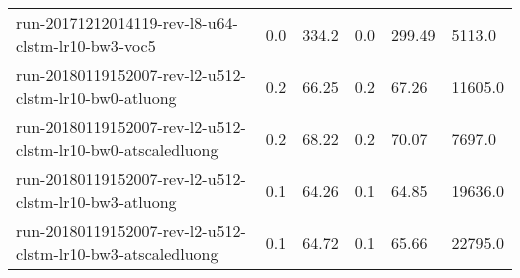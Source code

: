 \begin{landscape}
\begin{longtable}{p{.47\textheight} p{.08\textheight} p{.08\textheight} p{.08\textheight} p{.08\textheight} p{.08\textheight}}
    run-20171212014119-rev-l8-u64-clstm-lr10-bw3-voc5 & \num{0.0} & \num{334.2} & \num{0.0} & \num{299.49} & \num{5113.0}\\
    run-20180119152007-rev-l2-u512-clstm-lr10-bw0-atluong & \num{0.2} & \num{66.25} & \num{0.2} & \num{67.26} & \num{11605.0}\\
    run-20180119152007-rev-l2-u512-clstm-lr10-bw0-atscaledluong & \num{0.2} & \num{68.22} & \num{0.2} & \num{70.07} & \num{7697.0}\\
    run-20180119152007-rev-l2-u512-clstm-lr10-bw3-atluong & \num{0.1} & \num{64.26} & \num{0.1} & \num{64.85} & \num{19636.0}\\
    run-20180119152007-rev-l2-u512-clstm-lr10-bw3-atscaledluong & \num{0.1} & \num{64.72} & \num{0.1} & \num{65.66} & \num{22795.0}\\

\end{longtable}

\end{landscape}
